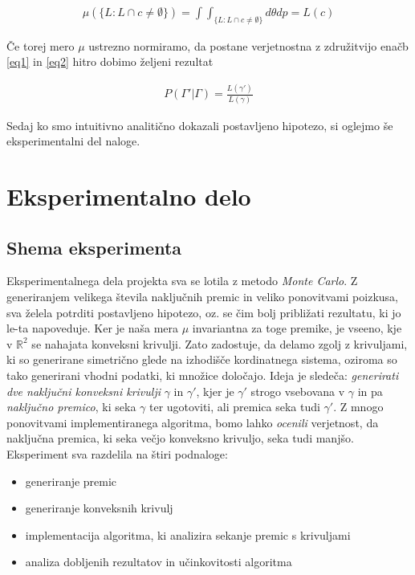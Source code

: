 \documentclass[a4paper]{article}
\begin{document}
\begin{align}
\mu(\{L:L \cap c \ne \emptyset \}) = \int \int _{\{L:L \cap c \ne \emptyset \}} d\theta dp = L(c) \label{eq2}
\end{align}

Če torej mero $\mu$ ustrezno normiramo, da postane verjetnostna z združitvijo enačb  \ref{eq1} in \ref{eq2} hitro dobimo željeni rezultat

\begin{align}
P(\Gamma' | \Gamma) = \frac{L(\gamma')}{L(\gamma)}
\end{align}

Sedaj ko smo intuitivno analitično dokazali postavljeno hipotezo, si oglejmo še eksperimentalni del naloge.







\section{Eksperimentalno delo}

\subsection{Shema eksperimenta}

Eksperimentalnega dela projekta sva se lotila z metodo \textit{Monte Carlo}. Z generiranjem velikega števila naključnih premic in veliko ponovitvami poizkusa, sva želela potrditi postavljeno hipotezo, oz. se čim bolj približati rezultatu, ki jo le-ta napoveduje. Ker je naša mera $\mu$ invariantna za toge premike, je vseeno, kje v $\mathbb{R}^2$ se nahajata konveksni krivulji. Zato zadostuje, da delamo zgolj z krivuljami, ki so generirane simetrično glede na izhodišče kordinatnega sistema, oziroma so tako generirani vhodni podatki, ki množice določajo.  Ideja je sledeča: \textit{generirati dve naključni konveksni krivulji} $\gamma$ in $\gamma'$, kjer je $\gamma'$ strogo vsebovana v $\gamma$ in pa \textit{naključno premico}, ki seka $\gamma$ ter ugotoviti, ali premica seka tudi $\gamma'$. Z mnogo ponovitvami implementiranega algoritma, bomo lahko \textit{ocenili} verjetnost, da naključna premica, ki seka večjo konveksno krivuljo, seka tudi manjšo. Eksperiment sva razdelila na štiri podnaloge:

\begin{itemize}
\item generiranje premic
\item generiranje konveksnih krivulj
\item implementacija algoritma, ki analizira sekanje premic s krivuljami
\item analiza dobljenih rezultatov in učinkovitosti algoritma
\end{itemize}
\end{document}
